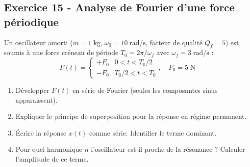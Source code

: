 \documentclass[12pt,a4paper]{article}
\begin{document}
\subsection*{Exercice 15 - Analyse de Fourier d'une force périodique \niveau{\difficile}}

\begin{boiteexercice}
Un oscillateur amorti ($m=1\;\text{kg}$, $\omega_0=10\;\text{rad/s}$, facteur de qualité $Q_f=5$) est soumis à une force créneau de période $T_0=2\pi/\omega_f$ avec $\omega_f=3\;\text{rad/s}$ :
\[
F(t) = \begin{cases} +F_0 & 0 < t < T_0/2 \\ -F_0 & T_0/2 < t < T_0 \end{cases}, \quad F_0 = 5\;\text{N}
\]
\begin{enumerate}
  \item Développer $F(t)$ en série de Fourier (seules les composantes sinus apparaissent).
  \item Expliquer le principe de superposition pour la réponse en régime permanent.
  \item Écrire la réponse $x(t)$ comme série. Identifier le terme dominant.
  \item Pour quel harmonique $n$ l'oscillateur est-il proche de la résonance ? Calculer l'amplitude de ce terme.
\end{enumerate}
\end{boiteexercice}
\end{document}
